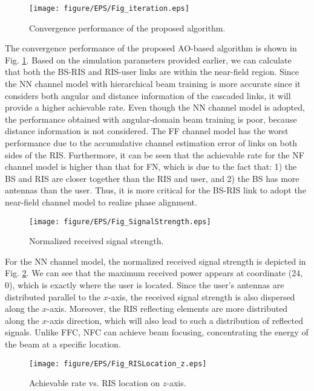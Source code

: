 \documentclass[lettersize, journal]{IEEEtran}
\begin{document}
\begin{figure}[t]
\centering
\texttt{[image: figure/EPS/Fig\_iteration.eps]}
\caption{Convergence performance of the proposed algorithm.}
\label{Fig_iteration}
\end{figure}


The convergence performance of the proposed AO-based algorithm is shown in Fig. {\ref{Fig_iteration}}.
Based on the simulation parameters provided earlier, we can calculate that both the BS-RIS and RIS-user links are within the near-field region. 
Since the NN channel model with hierarchical beam training is more accurate since it considers both angular and distance information of the cascaded links, it will provide a higher achievable rate.
Even though the NN channel model is adopted, the performance obtained with angular-domain beam training is poor, because distance information is not considered.
The FF channel model has the worst performance due to the accumulative channel estimation error of links on both sides of the RIS.
Furthermore, it can be seen that the achievable rate for the NF channel model is higher than that for FN, which is due to the fact that: 1) the BS and RIS are closer together than the RIS and user, and 2) the BS has more antennas than the user.
Thus, it is more critical for the BS-RIS link to adopt the near-field channel model to realize phase alignment. 


\begin{figure}[t]
\centering
\texttt{[image: figure/EPS/Fig\_SignalStrength.eps]}
\caption{Normalized received signal strength.}
\label{Fig_SignalStrength}
\end{figure}


For the NN channel model, the normalized received signal strength is depicted in Fig. {\ref{Fig_SignalStrength}}.
We can see that the maximum received power appears at coordinate (24, 0), which is exactly where the user is located.
Since the user's antennas are distributed parallel to the $x$-axis, the received signal strength is also dispersed along the $x$-axis.
Moreover, the RIS reflecting elements are more distributed along the $x$-axis direction, which will also lead to such a distribution of reflected signals.
Unlike FFC, NFC can achieve beam focusing, concentrating the energy of the beam at a specific location.


\begin{figure}[t]
\centering
\texttt{[image: figure/EPS/Fig\_RISLocation\_z.eps]}
\caption{Achievable rate vs. RIS location on $z$-axis.}
\label{Fig_RISLocation_z}
\end{figure}
\end{document}
